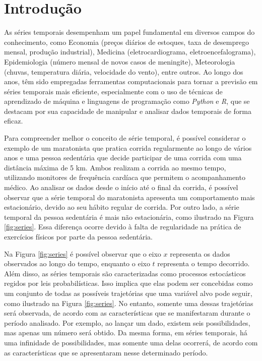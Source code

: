 



\section{Introdu{\c c}{\~a}o} \label{sec:int}


As séries temporais desempenham um papel fundamental em diversos campos do conhecimento, como Economia (preços diários de estoques, taxa de desemprego mensal, produção industrial), Medicina (eletrocardiograma, eletroencefalograma), Epidemiologia (número mensal de novos casos de meningite), Meteorologia (chuvas, temperatura diária, velocidade do vento), entre outros. Ao longo dos anos, têm sido empregadas ferramentas computacionais para tornar a previsão em séries temporais mais eficiente, especialmente com o uso de técnicas de aprendizado de máquina e linguagens de programação como \textit{Python} e \textit{R}, que se destacam por sua capacidade de manipular e analisar dados temporais de forma eficaz.

Para compreender melhor o conceito de série temporal, é possível considerar o exemplo de um maratonista que pratica corrida regularmente ao longo de vários anos e uma pessoa sedentária que decide participar de uma corrida com uma distância máxima de 5 km. Ambos realizam a corrida ao mesmo tempo, utilizando monitores de frequência cardíaca que permitem o acompanhamento médico. Ao analisar os dados desde o início até o final da corrida, é possível observar que a série temporal do maratonista apresenta um comportamento mais estacionário, devido ao seu hábito regular de corrida. Por outro lado, a série temporal da pessoa sedentária é mais não estacionária, como ilustrado na Figura \ref{fig:series}. Essa diferença ocorre devido à falta de regularidade na prática de exercícios físicos por parte da pessoa sedentária.



Na Figura \ref{fig:series} é possível observar que o eixo $x$ representa os dados observados ao longo do tempo, enquanto o eixo $t$ representa o tempo decorrido. Além disso, as séries temporais são caracterizadas como processos estocásticos regidos por leis probabilísticas. Isso implica que elas podem ser concebidas como um conjunto de todas as possíveis trajetórias que uma variável alvo pode seguir, como ilustrado na Figura \ref{fig:series}. No entanto, somente uma dessas trajetórias será observada, de acordo com as características que se manifestaram durante o período analisado. Por exemplo, ao lançar um dado, existem seis possibilidades, mas apenas um número será obtido. Da mesma forma, em séries temporais, há uma infinidade de possibilidades, mas somente uma delas ocorrerá, de acordo com as características que se apresentaram nesse determinado período.

